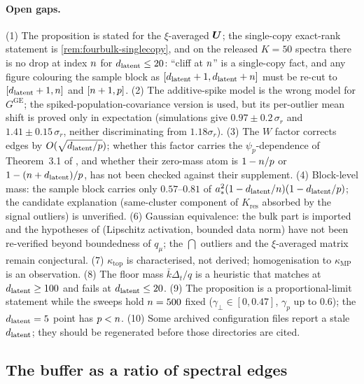 \paragraph{Open gaps.}
(1) The proposition is stated for the $\xi$-averaged $\bm{U}$; the single-copy exact-rank statement is \cref{rem:fourbulk-singlecopy}, and on the released $K=50$ spectra there is no drop at index $n$ for $d_{\mathrm{latent}}\le20$: ``cliff at $n$'' is a single-copy fact, and any figure colouring the sample block as $[d_{\mathrm{latent}}+1,d_{\mathrm{latent}}+n]$ must be re-cut to $[d_{\mathrm{latent}}+1,n]$ and $[n+1,p]$. (2) The additive-spike model is the wrong model for $G^{\mathrm{GE}}$; the spiked-population-covariance version is used, but its per-outlier mean shift is proved only in expectation (simulations give $0.97\pm0.2\,\sigma_r$ and $1.41\pm0.15\,\sigma_r$, neither discriminating from $1.18\sigma_r$). (3) The $W$ factor corrects edges by $O(\sqrt{d_{\mathrm{latent}}/p})$; whether this factor carries the $\psi_p$-dependence of Theorem~3.1 of \citet{bonnaire2025}, and whether their zero-mass atom is $1-n/p$ or $1-(n+d_{\mathrm{latent}})/p$, has not been checked against their supplement. (4) Block-level mass: the sample block carries only $0.57$--$0.81$ of $a_*^2(1-d_{\mathrm{latent}}/n)(1-d_{\mathrm{latent}}/p)$; the candidate explanation (same-cluster component of $K_{\mathrm{res}}$ absorbed by the signal outliers) is unverified. (6) Gaussian equivalence: the bulk part is imported and the hypotheses of \citet{louart2018random} (Lipschitz activation, bounded data norm) have not been re-verified beyond boundedness of $q_\mu$; the $\dint$ outliers and the $\xi$-averaged matrix remain conjectural. (7) $\kappa_{\mathrm{top}}$ is characterised, not derived; homogenisation to $\kappa_{\mathrm{MP}}$ is an observation. (8) The floor mass $\bar k\Delta_t/q$ is a heuristic that matches at $d_{\mathrm{latent}}\ge100$ and fails at $d_{\mathrm{latent}}\le20$. (9) The proposition is a proportional-limit statement while the sweeps hold $n=500$ fixed ($\gamma_\perp\in[0,0.47]$, $\gamma_p$ up to $0.6$); the $d_{\mathrm{latent}}=5$ point has $p<n$. (10) Some archived configuration files report a stale $d_{\mathrm{latent}}$; they should be regenerated before those directories are cited.

\subsection{The buffer as a ratio of spectral edges}
\label{app:theory-buffer}

